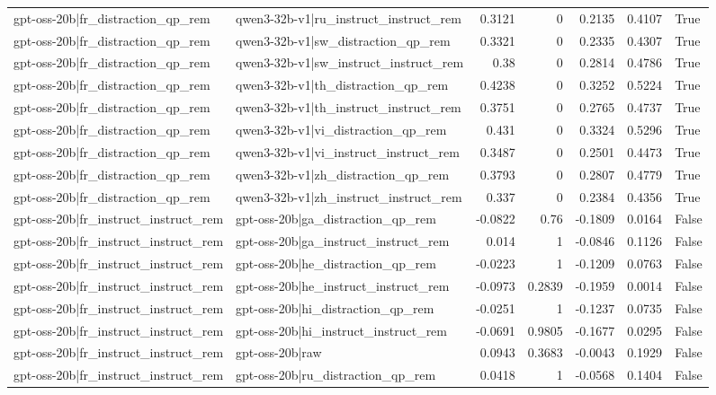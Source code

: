 \begin{table}
\begin{tabular}{l l r r r r l}
gpt-oss-20b|fr_distraction_qp_rem & qwen3-32b-v1|ru_instruct_instruct_rem & 0.3121 & 0 & 0.2135 & 0.4107 & True \\
gpt-oss-20b|fr_distraction_qp_rem & qwen3-32b-v1|sw_distraction_qp_rem & 0.3321 & 0 & 0.2335 & 0.4307 & True \\
gpt-oss-20b|fr_distraction_qp_rem & qwen3-32b-v1|sw_instruct_instruct_rem & 0.38 & 0 & 0.2814 & 0.4786 & True \\
gpt-oss-20b|fr_distraction_qp_rem & qwen3-32b-v1|th_distraction_qp_rem & 0.4238 & 0 & 0.3252 & 0.5224 & True \\
gpt-oss-20b|fr_distraction_qp_rem & qwen3-32b-v1|th_instruct_instruct_rem & 0.3751 & 0 & 0.2765 & 0.4737 & True \\
gpt-oss-20b|fr_distraction_qp_rem & qwen3-32b-v1|vi_distraction_qp_rem & 0.431 & 0 & 0.3324 & 0.5296 & True \\
gpt-oss-20b|fr_distraction_qp_rem & qwen3-32b-v1|vi_instruct_instruct_rem & 0.3487 & 0 & 0.2501 & 0.4473 & True \\
gpt-oss-20b|fr_distraction_qp_rem & qwen3-32b-v1|zh_distraction_qp_rem & 0.3793 & 0 & 0.2807 & 0.4779 & True \\
gpt-oss-20b|fr_distraction_qp_rem & qwen3-32b-v1|zh_instruct_instruct_rem & 0.337 & 0 & 0.2384 & 0.4356 & True \\
gpt-oss-20b|fr_instruct_instruct_rem & gpt-oss-20b|ga_distraction_qp_rem & -0.0822 & 0.76 & -0.1809 & 0.0164 & False \\
gpt-oss-20b|fr_instruct_instruct_rem & gpt-oss-20b|ga_instruct_instruct_rem & 0.014 & 1 & -0.0846 & 0.1126 & False \\
gpt-oss-20b|fr_instruct_instruct_rem & gpt-oss-20b|he_distraction_qp_rem & -0.0223 & 1 & -0.1209 & 0.0763 & False \\
gpt-oss-20b|fr_instruct_instruct_rem & gpt-oss-20b|he_instruct_instruct_rem & -0.0973 & 0.2839 & -0.1959 & 0.0014 & False \\
gpt-oss-20b|fr_instruct_instruct_rem & gpt-oss-20b|hi_distraction_qp_rem & -0.0251 & 1 & -0.1237 & 0.0735 & False \\
gpt-oss-20b|fr_instruct_instruct_rem & gpt-oss-20b|hi_instruct_instruct_rem & -0.0691 & 0.9805 & -0.1677 & 0.0295 & False \\
gpt-oss-20b|fr_instruct_instruct_rem & gpt-oss-20b|raw & 0.0943 & 0.3683 & -0.0043 & 0.1929 & False \\
gpt-oss-20b|fr_instruct_instruct_rem & gpt-oss-20b|ru_distraction_qp_rem & 0.0418 & 1 & -0.0568 & 0.1404 & False \\

\end{tabular}
\end{table}
